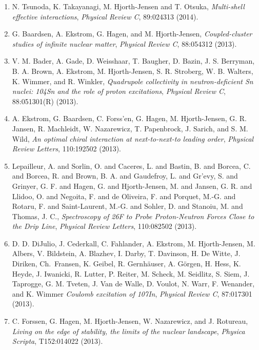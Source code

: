 \documentclass[%
oneside,                 %
final,                   %
10pt]{article}
\begin{document}
\begin{enumerate}
\item N. Tsunoda, K. Takayanagi, M. Hjorth-Jensen and T. Otsuka,  \emph{Multi-shell effective interactions},   \emph{Physical Review C},    89:024313 (2014).

\item G. Baardsen, A. Ekstrom, G. Hagen, and M. Hjorth-Jensen,  \emph{Coupled-cluster studies of infinite  nuclear matter},   \emph{Physical Review C}, 88:054312 (2013).  

\item V. M. Bader, A. Gade, D. Weisshaar, T. Baugher, D. Bazin, J. S. Berryman, B. A. Brown, A. Ekstrom, M. Hjorth-Jensen, S. R. Stroberg, W. B. Walters, K. Wimmer, and R. Winkler,   \emph{Quadrupole collectivity in neutron-deficient Sn nuclei: 104Sn and the role of proton excitations},   \emph{Physical Review C},  88:051301(R) (2013). 

\item A. Ekstrom, G. Baardsen, C. Forss'en, G. Hagen, M. Hjorth-Jensen, G. R. Jansen, R. Machleidt, W. Nazarewicz, T. Papenbrock, J. Sarich, and S. M. Wild,   \emph{An optimal chiral interaction at next-to-next-to leading order},   \emph{Physical Review Letters},  110:192502 (2013).  

\item Lepailleur, A. and Sorlin, O. and Caceres, L. and Bastin, B. and Borcea, C. and Borcea, R. and Brown, B. A. and Gaudefroy, L. and Gr'evy, S. and Grinyer, G. F. and Hagen, G. and Hjorth-Jensen, M. and Jansen, G. R. and Llidoo, O. and Negoita, F. and de Oliveira, F. and Porquet, M.-G. and Rotaru, F. and Saint-Laurent, M.-G. and Sohler, D. and Stanoiu, M. and Thomas, J. C.,  \emph{Spectroscopy of 26F to Probe Proton-Neutron Forces Close to the Drip Line},   \emph{Physical Review Letters},  110:082502 (2013). 

\item D. D. DiJulio, J. Cederkall, C. Fahlander, A. Ekstrom, M. Hjorth-Jensen, M. Albers, V. Bildstein, A. Blazhev, I. Darby, T. Davinson, H. De Witte, J. Diriken, Ch.~Fransen, K. Geibel, R. Gernhäuser, A. Görgen, H. Hess, K. Heyde, J. Iwanicki, R. Lutter, P. Reiter, M. Scheck, M. Seidlitz, S. Siem, J. Taprogge, G. M. Tveten, J. Van de Walle, D. Voulot, N. Warr, F. Wenander, and K. Wimmer  \emph{Coulomb excitation of 107In},   \emph{Physical Review C},  87:017301 (2013).   

\item C. Forssen, G. Hagen, M. Hjorth-Jensen, W. Nazarewicz, and J. Rotureau,  \emph{Living on the edge of stability, the limits of the nuclear landscape},   \emph{Physica Scripta},  T152:014022 (2013). 


\end{enumerate}
\end{document}
